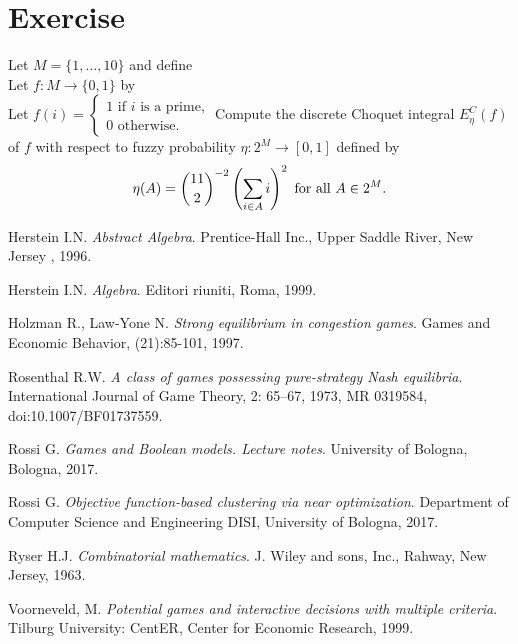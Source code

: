 \documentclass{article}
\begin{document}
\section{Exercise}
Let $M=\{1,\ldots,10\}$ and define \\
Let $f:M\rightarrow\{0,1\}$ by \\
Let $f(i)=\left\{\begin{array}{c}
                        1\text{ if }i\text{ is a prime,}\\
                        0\text{ otherwise.}
             \end{array}\right .$
Compute the discrete Choquet integral $E_{\eta}^C(f)$ of $f$ with respect to fuzzy probability $\eta:2^M\rightarrow[0,1]$ defined by
$$\eta(A)=\binom{11}{2}^{-2}\left(\sum_{i\in A}i\right)^2\text{ for all }A\in 2^M\text .$$


\medskip
 

\begin{thebibliography}{9}
Herstein I.N.
\textit{Abstract Algebra}. 
Prentice-Hall Inc., Upper Saddle River, New Jersey , 1996.

Herstein I.N.
\textit{Algebra}. 
Editori riuniti, Roma, 1999.

Holzman R., Law-Yone N.
\textit{Strong equilibrium in congestion games}.
Games and Economic Behavior, (21):85-101, 1997.

Rosenthal R.W.
\textit{A class of games possessing pure-strategy Nash equilibria}.
International Journal of Game Theory, 2: 65–67, 1973, MR 0319584, doi:10.1007/BF01737559.

Rossi G.
\textit{Games and Boolean models. Lecture notes}.
University of Bologna, Bologna, 2017.

Rossi G.
\textit{Objective function-based clustering via near optimization}.
Department of Computer Science and Engineering DISI, University of Bologna, 2017.

Ryser H.J.
\textit{Combinatorial mathematics}.
J. Wiley and sons, Inc., Rahway, New Jersey, 1963.


Voorneveld, M. 
\textit{Potential games and interactive decisions with multiple criteria}.
Tilburg University: CentER, Center for Economic Research, 1999.

 

\end{thebibliography}
\end{document}
